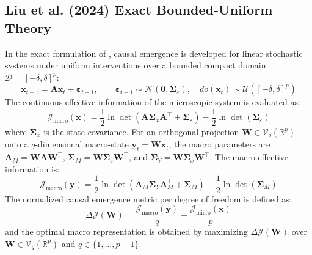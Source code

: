 \documentclass[12pt]{article}
\begin{document}
\subsection{Liu et al. (2024) Exact Bounded-Uniform Theory}
In the exact formulation of \citet{liu2024exact}, causal emergence is developed for linear stochastic systems under uniform interventions over a bounded compact domain $\mathcal{D} = [-\delta, \delta]^p$:
\begin{equation}
\mathbf{x}_{t+1} = \mathbf{A}\mathbf{x}_t + \boldsymbol{\varepsilon}_{t+1}, \qquad \boldsymbol{\varepsilon}_{t+1} \sim \mathcal{N}(\mathbf{0}, \boldsymbol{\Sigma}_\varepsilon), \quad do(\mathbf{x}_t) \sim \mathcal{U}([-\delta, \delta]^p)
\end{equation}
The continuous effective information of the microscopic system is evaluated as:
\begin{equation}
\mathcal{J}_{\text{micro}}(\mathbf{x}) = \frac{1}{2}\ln\det\left(\mathbf{A}\boldsymbol{\Sigma}_x \mathbf{A}^\top + \boldsymbol{\Sigma}_\varepsilon\right) - \frac{1}{2}\ln\det(\boldsymbol{\Sigma}_\varepsilon)
\end{equation}
where $\boldsymbol{\Sigma}_x$ is the state covariance. For an orthogonal projection $\mathbf{W} \in \mathcal{V}_q(\mathbb{R}^p)$ onto a $q$-dimensional macro-state $\mathbf{y}_t = \mathbf{W}\mathbf{x}_t$, the macro parameters are $\mathbf{A}_M = \mathbf{W}\mathbf{A}\mathbf{W}^\top$, $\boldsymbol{\Sigma}_M = \mathbf{W}\boldsymbol{\Sigma}_\varepsilon \mathbf{W}^\top$, and $\boldsymbol{\Sigma}_Y = \mathbf{W}\boldsymbol{\Sigma}_x \mathbf{W}^\top$. The macro effective information is:
\begin{equation}
\mathcal{J}_{\text{macro}}(\mathbf{y}) = \frac{1}{2}\ln\det\left(\mathbf{A}_M \boldsymbol{\Sigma}_Y \mathbf{A}_M^\top + \boldsymbol{\Sigma}_M\right) - \frac{1}{2}\ln\det(\boldsymbol{\Sigma}_M)
\end{equation}
The normalized causal emergence metric per degree of freedom is defined as:
\begin{equation}
\Delta \mathcal{J}(\mathbf{W}) = \frac{\mathcal{J}_{\text{macro}}(\mathbf{y})}{q} - \frac{\mathcal{J}_{\text{micro}}(\mathbf{x})}{p}
\end{equation}
and the optimal macro representation is obtained by maximizing $\Delta \mathcal{J}(\mathbf{W})$ over $\mathbf{W} \in \mathcal{V}_q(\mathbb{R}^p)$ and $q \in \{1, \dots, p-1\}$.
\end{document}
